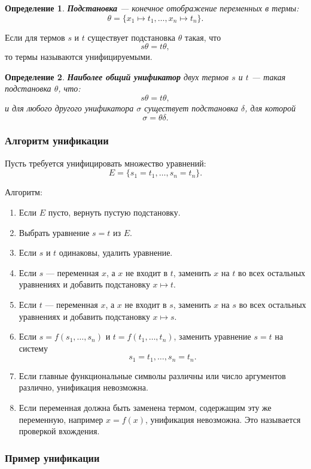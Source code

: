 \documentclass[12pt,a4paper]{article}
\newtheorem{definition}{Определение}
\begin{document}
\begin{definition}
\textbf{Подстановка} --- конечное отображение переменных в термы:
$$
\theta = \{x_1 \mapsto t_1,\dots,x_n \mapsto t_n\}.
$$
\end{definition}

Если для термов $s$ и $t$ существует подстановка $\theta$ такая, что
$$
s\theta = t\theta,
$$
то термы называются унифицируемыми.

\begin{definition}
\textbf{Наиболее общий унификатор} двух термов $s$ и $t$ --- такая подстановка $\theta$, что:
$$
s\theta = t\theta,
$$
и для любого другого унификатора $\sigma$ существует подстановка $\delta$, для которой
$$
\sigma = \theta \delta.
$$
\end{definition}

\subsubsection{Алгоритм унификации}

Пусть требуется унифицировать множество уравнений:
$$
E = \{s_1 = t_1,\dots,s_n=t_n\}.
$$

Алгоритм:
\begin{enumerate}
    \item Если $E$ пусто, вернуть пустую подстановку.
    \item Выбрать уравнение $s=t$ из $E$.
    \item Если $s$ и $t$ одинаковы, удалить уравнение.
    \item Если $s$ --- переменная $x$, а $x$ не входит в $t$, заменить $x$ на $t$ во всех остальных уравнениях и добавить подстановку $x \mapsto t$.
    \item Если $t$ --- переменная $x$, а $x$ не входит в $s$, заменить $x$ на $s$ во всех остальных уравнениях и добавить подстановку $x \mapsto s$.
    \item Если $s=f(s_1,\dots,s_n)$ и $t=f(t_1,\dots,t_n)$, заменить уравнение $s=t$ на систему
    $$
    s_1=t_1,\dots,s_n=t_n.
    $$
    \item Если главные функциональные символы различны или число аргументов различно, унификация невозможна.
    \item Если переменная должна быть заменена термом, содержащим эту же переменную, например $x=f(x)$, унификация невозможна. Это называется проверкой вхождения.
\end{enumerate}

\subsubsection{Пример унификации}
\end{document}
